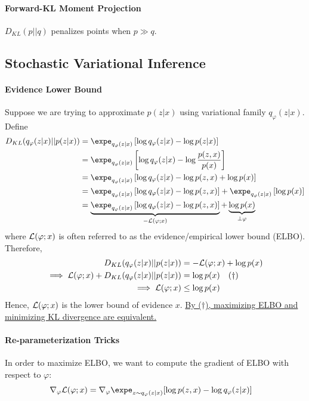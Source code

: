 \documentclass{article}
\begin{document}
	\paragraph{Forward-KL Moment Projection} $D_{KL}(p||q)$ penalizes points when $p \gg q$.
	
	\subsection{Stochastic Variational Inference}
	\paragraph{Evidence Lower Bound} Suppose we are trying to approximate $p(z|x)$ using variational family $q_\varphi(z|x)$. Define
	\begin{align}
		D_{KL}(q_\varphi(z|x) || p(z|x)) 
		&= \expe_{q_\varphi(z|x)} \left[
		\log q_\varphi(z|x) - \log p(z|x)
		\right] \\
		&= \expe_{q_\varphi(z|x)} \left[
		\log q_\varphi(z|x) - \log \frac{p(z, x)}{p(x)}
		\right] \\
		&= \expe_{q_\varphi(z|x)} \left[
		\log q_\varphi(z|x) - \log p(z, x) + \log p(x)
		\right] \\
		&= \expe_{q_\varphi(z|x)} \left[
		\log q_\varphi(z|x) - \log p(z, x) \right]
		+ \expe_{q_\varphi(z|x)} \left[ \log p(x)
		\right] \\
		&= \underbrace{\expe_{q_\varphi(z|x)} \left[
		\log q_\varphi(z|x) - \log p(z, x) \right]}_{-\mc{L}(\varphi;x)}
		+ \underbrace{\log p(x)}_{\perp \varphi}
	\end{align}
	where $\mathcal{{L}}(\varphi; x)$ is often referred to as the evidence/empirical lower bound (ELBO). Therefore,
	\begin{align}
		D_{KL}(q_\varphi(z|x) || p(z|x)) &= - \mathcal{{L}}(\varphi;x) + \log p(x) \\
		\implies \mathcal{{L}}(\varphi;x) + D_{KL}(q_\varphi(z|x) || p(z|x)) &= \log p(x)\quad (\dagger) \\
		\implies \mathcal{{L}}(\varphi; x) &\leq \log p(x)
	\end{align}
	Hence, $\mathcal{{L}}(\varphi; x)$ is the lower bound of evidence $x$. \ul{By ($\dagger$), maximizing ELBO and minimizing KL divergence are equivalent.}
	
	\paragraph{Re-parameterization Tricks} In order to maximize ELBO, we want to compute the gradient of ELBO with respect to $\varphi$:
	\begin{align}
		\nabla_\varphi \mc{L}(\varphi; x)
		&= \nabla_\varphi \expe_{z \sim q_\varphi(z|x)} [
		\log p(z, x) - \log q_\varphi(z|x)]
	\end{align}
	
\end{document}
